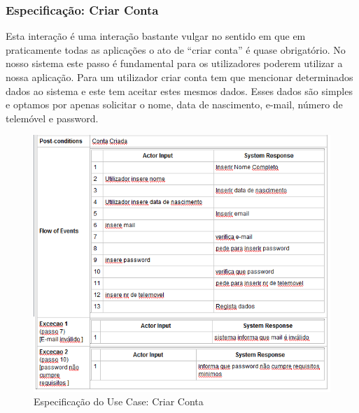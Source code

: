 \newpage \clearpage

\subsubsection{Especificação: Criar Conta }
Esta interação é uma interação bastante vulgar no sentido em que em praticamente todas as aplicações o ato de “criar conta” é quase obrigatório.  No nosso sistema este passo é fundamental para os utilizadores poderem utilizar a nossa aplicação. Para um utilizador criar conta tem que mencionar determinados dados ao sistema e este tem aceitar estes mesmos dados. Esses dados são simples e optamos por apenas solicitar o nome, data de nascimento, e-mail, número de telemóvel e password.

\begin{figure}[htb!]
	\centering
	\includegraphics[scale=0.6]{imagens/Especificacoes/criarconta}  
	\caption{Especificação do Use Case: Criar Conta   }  
\end{figure}

